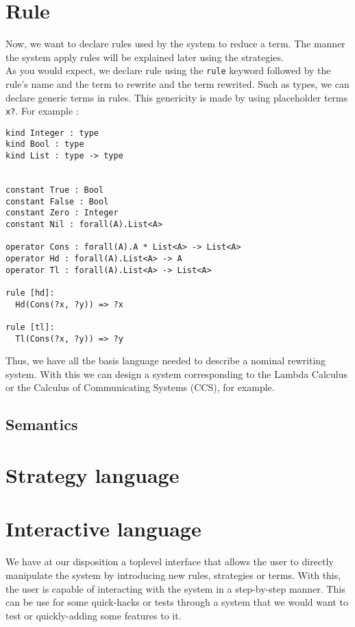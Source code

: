 \documentclass[12pt,a4paper]{article}
\begin{document}
\section{Rule}
Now, we want to declare rules used by the system to reduce a term.
The manner the system apply rules will be explained later using the
strategies.\\
As you would expect, we declare rule using the \verb?rule? keyword
followed by the rule's name and the term to rewrite and the term
rewrited. Such as types, we can declare generic terms in rules. This
genericity is made by using placeholder terms \verb!x?!. For example :
\begin{verbatim}
kind Integer : type
kind Bool : type
kind List : type -> type


constant True : Bool
constant False : Bool
constant Zero : Integer
constant Nil : forall(A).List<A>

operator Cons : forall(A).A * List<A> -> List<A>
operator Hd : forall(A).List<A> -> A
operator Tl : forall(A).List<A> -> List<A>

rule [hd]:
  Hd(Cons(?x, ?y)) => ?x

rule [tl]:
  Tl(Cons(?x, ?y)) => ?y
\end{verbatim}


Thus, we have all the basis language needed to describe a nominal
rewriting system. With this we can design a system
corresponding to the Lambda Calculus or the Calculus of Communicating
Systems (CCS), for example.

\subsection{Semantics}

\section{Strategy language}

\section{Interactive language}

We have at our disposition a toplevel interface that allows the user
to directly manipulate the system by introducing new rules, strategies
or terms. With this, the user is capable of interacting with the
system in a step-by-step manner. This can be use for some quick-hacks
or tests through a system that we would want to test or quickly-adding
some features to it.
\end{document}
